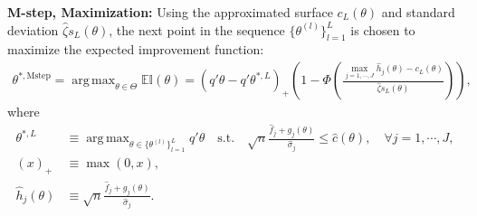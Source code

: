 \documentclass[12pt]{article}
\DeclareMathOperator*{\argmax}{arg\,max}
\begin{document}
\textbf{M-step, Maximization:}  Using the approximated surface $c_L(\theta)$ and standard deviation $\hat \zeta s_L(\theta)$, the next point in the sequence $\{\theta^{(l)}\}_{l=1}^{L}$ is chosen to maximize the expected improvement function:
\begin{align}\label{eq:Mstep}
\theta^{*,\text{Mstep}} =\argmax_{\theta \in \Theta} \mathbb{E}\mathbb{I}(\theta) = (q' \theta - q' \theta^{*,L})_+ \left(1 - \Phi \left( \frac{ \max_{j=1,\cdots,J} \hat h_j(\theta) - c_L(\theta)}{\hat \zeta s_L(\theta)} \right) \right),
\end{align}
where
\begin{align*}
 \theta^{*,L}& \equiv \argmax_{\theta \in \{\theta^{(l)}\}_{l=1}^L}  q'\theta \quad \text{s.t.}  \quad \sqrt{n} \frac{\hat f_j + g_j(\theta)}{\hat \sigma_j} \leq \hat c(\theta), \quad  \forall j = 1,\cdots,J,
\\
(x)_{+} &\equiv \max(0,x),
\\
\hat h_j(\theta) & \equiv \sqrt{n} \frac{\hat f_j+ g_j(\theta)}{\hat \sigma_j}.
\end{align*}
\end{document}
